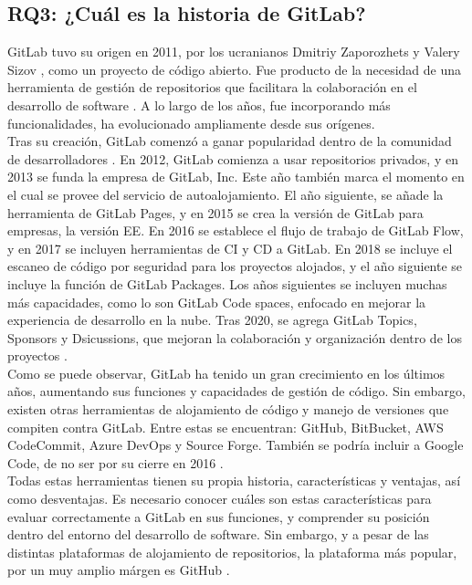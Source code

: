 \documentclass[runningheads]{llncs}
\begin{document}
\subsection{RQ3: ¿Cuál es la historia de GitLab?}
GitLab tuvo su origen en 2011, por los ucranianos Dmitriy Zaporozhets y Valery Sizov \cite{gitlab2022gitlab}, como un proyecto de código abierto. Fue
producto de la necesidad de una herramienta de gestión de repositorios que facilitara la colaboración en el desarrollo de software \cite{safari2020analysis}.
A lo largo de los años, fue incorporando más funcionalidades, ha evolucionado ampliamente desde sus orígenes.\\
Tras su creación, GitLab comenzó a ganar popularidad dentro de la comunidad de desarrolladores \cite{uddin2023comparative}. En 2012, GitLab comienza a usar
repositorios privados, y en 2013 se funda la empresa de GitLab, Inc. Este año también marca el momento en el cual se provee del servicio de autoalojamiento.
El año siguiente, se añade la herramienta de GitLab Pages, y en 2015 se crea la versión de GitLab para empresas, la versión EE. En 2016 se establece el flujo
de trabajo de GitLab Flow, y en 2017 se incluyen herramientas de CI y CD a GitLab. En 2018 se incluye el escaneo de código por seguridad para los proyectos
alojados, y el año siguiente se incluye la función de GitLab Packages. Los años siguientes se incluyen muchas más capacidades, como lo son GitLab Code spaces,
enfocado en mejorar la experiencia de desarrollo en la nube. Tras 2020, se agrega GitLab Topics, Sponsors y Dsicussions, que mejoran la colaboración y organización
dentro de los proyectos \cite{uddin2023comparative}.\\
Como se puede observar, GitLab ha tenido un gran crecimiento en los últimos años, aumentando sus funciones y capacidades de gestión de código. Sin embargo,
existen otras herramientas de alojamiento de código y manejo de versiones que compiten contra GitLab. Entre estas se encuentran: GitHub, BitBucket, AWS CodeCommit,
Azure DevOps y Source Forge. También se podría incluir a Google Code, de no ser por su cierre en 2016 \cite{safari2020analysis}.\\
Todas estas herramientas tienen su propia historia, características y ventajas, así como desventajas. Es necesario conocer cuáles son estas características para
evaluar correctamente a GitLab en sus funciones, y comprender su posición dentro del entorno del desarrollo de software. Sin embargo, y a pesar de las distintas
plataformas de alojamiento de repositorios, la plataforma más popular, por un muy amplio márgen es GitHub \cite{uddin2023comparative}.
\end{document}
